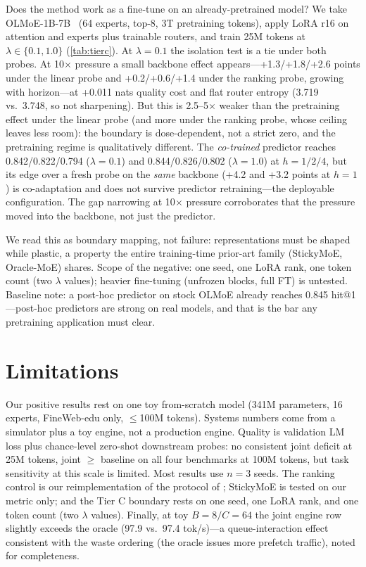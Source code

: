 \documentclass[10pt,letterpaper]{article}
\begin{document}
Does the method work as a fine-tune on an already-pretrained model? We take OLMoE-1B-7B~\citep{muennighoff2024olmoe} (64 experts, top-8, 3T pretraining tokens), apply LoRA r16 on attention and experts plus trainable routers, and train 25M tokens at $\lambda \in \{0.1, 1.0\}$ (\cref{tab:tierc}). At $\lambda{=}0.1$ the isolation test is a tie under both probes. At 10$\times$ pressure a small backbone effect appears---+1.3/+1.8/+2.6 points under the linear probe and +0.2/+0.6/+1.4 under the ranking probe, growing with horizon---at +0.011 nats quality cost and flat router entropy (3.719 vs.\ 3.748, so not sharpening). But this is 2.5--5$\times$ weaker than the pretraining effect under the linear probe (and more under the ranking probe, whose ceiling leaves less room): the boundary is dose-dependent, not a strict zero, and the pretraining regime is qualitatively different. The \emph{co-trained} predictor reaches 0.842/0.822/0.794 ($\lambda{=}0.1$) and 0.844/0.826/0.802 ($\lambda{=}1.0$) at $h{=}1/2/4$, but its edge over a fresh probe on the \emph{same} backbone (+4.2 and +3.2 points at $h{=}1$) is co-adaptation and does not survive predictor retraining---the deployable configuration. The gap narrowing at 10$\times$ pressure corroborates that the pressure moved into the backbone, not just the predictor.

We read this as boundary mapping, not failure: representations must be shaped while plastic, a property the entire training-time prior-art family (StickyMoE, Oracle-MoE) shares. Scope of the negative: one seed, one LoRA rank, one token count (two $\lambda$ values); heavier fine-tuning (unfrozen blocks, full FT) is untested. Baseline note: a post-hoc predictor on stock OLMoE already reaches 0.845 hit@1---post-hoc predictors are strong on real models, and that is the bar any pretraining application must clear.

\section{Limitations}
\label{sec:limitations}

Our positive results rest on one toy from-scratch model (341M parameters, 16 experts, FineWeb-edu only, $\le$100M tokens). Systems numbers come from a simulator plus a toy engine, not a production engine. Quality is validation LM loss plus chance-level zero-shot downstream probes: no consistent joint deficit at 25M tokens, joint $\ge$ baseline on all four benchmarks at 100M tokens, but task sensitivity at this scale is limited. Most results use $n{=}3$ seeds. The ranking control is our reimplementation of the protocol of \citet{zhu2025preattention}; StickyMoE is tested on our metric only; and the Tier C boundary rests on one seed, one LoRA rank, and one token count (two $\lambda$ values). Finally, at toy $B{=}8/C{=}64$ the joint engine row slightly exceeds the oracle (97.9 vs.\ 97.4 tok/s)---a queue-interaction effect consistent with the waste ordering (the oracle issues more prefetch traffic), noted for completeness.
\end{document}
